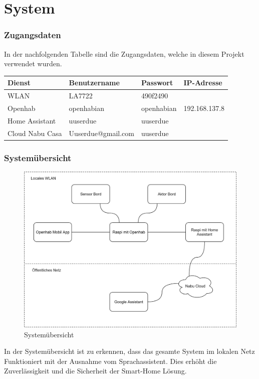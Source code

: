 \section{System}\label{sec:Schluss}
\subsubsection{Zugangsdaten}
In der nachfolgenden Tabelle sind die Zugangsdaten, welche in diesem Projekt verwendet wurden.

\begin{table}[H]
	\centering
	\begin{tabular}{|l|l|l|l|}
		\hline 
		Dienst & Benutzername & Passwort & IP-Adresse \\ 
		\hline 
		WLAN & LA7722 & 490f2490 &  \\ 
		\hline 
		Openhab & openhabian & openhabian & 192.168.137.8 \\ 
		\hline 
		Home Assistant & uuserdue & uuserdue &  \\ 
		\hline 
		Cloud Nabu Casa & Uuserdue@gmail.com&uuserdue&\\
		\hline
	\end{tabular} 
\end{table}
\subsubsection{Systemübersicht}
   \begin{figure}[H]
	\centering
	\includegraphics[width=\textwidth]{graphics/Systemubersicht.png}
	\caption{Systemübersicht} 	
	\label{pic: Systemübersicht}
\end{figure}
In der Systemübersicht ist zu erkennen, dass das gesamte System im lokalen Netz Funktioniert mit der Ausnahme vom Sprachassistent. Dies erhöht die Zuverlässigkeit und die Sicherheit der Smart-Home Lösung. 




